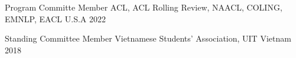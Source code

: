

\begin{cvhonors}

  \cvhonor
    {Program Committe Member} %
    {ACL, ACL Rolling Review, NAACL, COLING, EMNLP, EACL} %
    {U.S.A} %
    {2022} %

    
  \cvhonor
    {Standing Committee Member} %
    {Vietnamese Students’ Association, UIT} %
    {Vietnam} %
    {2018} %

\end{cvhonors}
